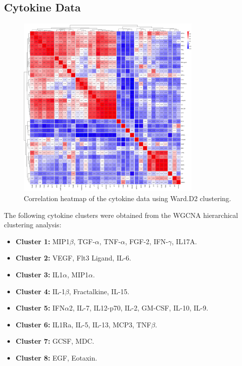 \documentclass[12pt,a4paper]{report}
\begin{document}
\pagebreak
\subsection{Cytokine Data}
\begin{figure}[H]
  \centering
  \includegraphics[width=0.8\textwidth]{images/Cytokine_euclidean_distance.png}
  \caption{Correlation heatmap of the cytokine data using Ward.D2 clustering.}
  \label{fig:cytokine_heatmap}
\end{figure}

The following cytokine clusters were obtained from the WGCNA hierarchical clustering analysis:

\begin{itemize}
    \item \textbf{Cluster 1:} MIP1$\beta$, TGF-$\alpha$, TNF-$\alpha$, FGF-2, IFN-$\gamma$, IL17A.
    \item \textbf{Cluster 2:} VEGF, Flt3 Ligand, IL-6.
    \item \textbf{Cluster 3:} IL1$\alpha$, MIP1$\alpha$.
    \item \textbf{Cluster 4:} IL-1$\beta$, Fractalkine, IL-15.
    \item \textbf{Cluster 5:} IFN$\alpha$2, IL-7, IL12-p70, IL-2, GM-CSF, IL-10, IL-9.
    \item \textbf{Cluster 6:} IL1Ra, IL-5, IL-13, MCP3, TNF$\beta$.
    \item \textbf{Cluster 7:} GCSF, MDC.
    \item \textbf{Cluster 8:} EGF, Eotaxin.
\end{itemize}
\end{document}
